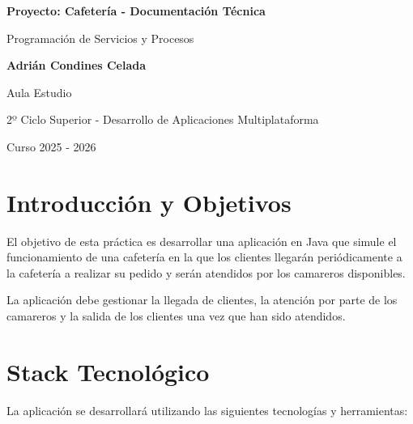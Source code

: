 \documentclass[12pt]{article}
\begin{document}
\begin{titlepage}

    \centering

    \vspace*{1 cm}
    
    \Huge
    \textbf{Proyecto: Cafetería - Documentación Técnica}
    
    \vspace{0.5 cm}
    
    \Large
    Programación de Servicios y Procesos
    
    \vspace{5.5 cm}
    
    \textbf{Adrián Condines Celada}
    
    \vspace{0.8 cm}
        
    \normalsize
    Aula Estudio\\

    \vspace{0.8 cm}

    2º Ciclo Superior - Desarrollo de Aplicaciones Multiplataforma\\

    \vspace{0.8 cm}

    Curso 2025 - 2026

\end{titlepage}

\tableofcontents
\newpage

\section{Introducción y Objetivos}

\justify
El objetivo de esta práctica es desarrollar una aplicación en Java que simule el funcionamiento de una cafetería en la que los clientes llegarán periódicamente a la cafetería a realizar su pedido y serán atendidos por los camareros disponibles. 

\justify
La aplicación debe gestionar la llegada de clientes, la atención por parte de los camareros y la salida de los clientes una vez que han sido atendidos.

\section{Stack Tecnológico}
\justify
La aplicación se desarrollará utilizando las siguientes tecnologías y herramientas:
\end{document}
